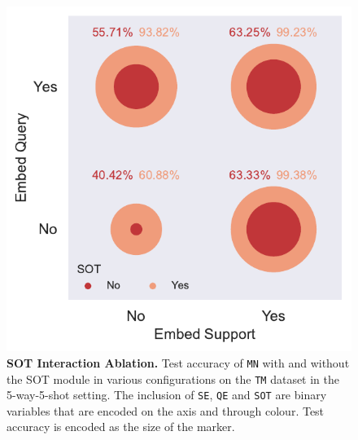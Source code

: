 \begin{figure}[h!]
    \centering
    \includegraphics[width=0.75\columnwidth]{../figures/sot-interaction-scatter.pdf}
    \caption{\textbf{SOT Interaction Ablation.} Test accuracy of \texttt{MN} with and without the SOT module in various configurations on the \texttt{TM} dataset in the 5-way-5-shot setting. The inclusion of \texttt{SE}, \texttt{QE} and \texttt{SOT} are binary variables that are encoded on the axis and through colour. Test accuracy is encoded as the size of the marker.}
    \label{fig:sot-interaction-scatter}
\end{figure}
